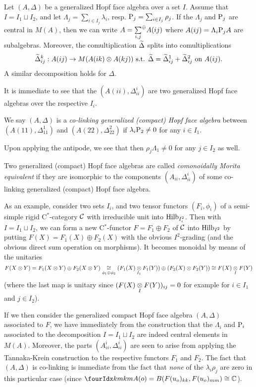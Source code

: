 Let $(A,\Delta)$ be a generalized Hopf face algebra over a set $I$. Assume that $I = I_1\sqcup I_2$, and let $\Lambda_j = \sum_{i\in I_j}\lambda_i$, resp. $\mathrm{P}_j = \sum_{i\in I_j} \rho_j$. If the $\Lambda_j$ and $\mathrm{P}_j$ are central in $M(A)$, then we can write $A = \underset{i,j}{\sum}^{\oplus} A(ij)$ where $A(ij) = \Lambda_i\mathrm{P}_jA$ are subalgebras. Moreover, the comultiplication $\widetilde{\Delta}$ splits into comultiplications \[\widetilde{\Delta}_{ij}^k:A(ij)\rightarrow M(A(ik)\otimes A(kj))\textrm{ s.t. } \widetilde{\Delta} = \widetilde{\Delta}_{ij}^1 +\widetilde{\Delta}_{ij}^2 \textrm{ on }A(ij).\] A similar decomposition holds for $\Delta$.

It is immediate to see that the $(A(ii),\Delta_{ii}^i)$ are two generalized Hopf face algebras over the respective $I_i$.

\begin{Def} We say $(A,\Delta)$ is a \emph{co-linking generalized (compact) Hopf face algebra} between $(A(11),\Delta_{11}^1)$ and $(A(22),\Delta_{22}^2)$ if $\lambda_i\mathrm{P}_2\neq 0$ for any $i\in I_1$.
\end{Def}

Upon applying the antipode, we see that then $\rho_j\Lambda_1\neq 0$ for any $j\in I_2$ as well.

\begin{Def} Two generalized (compact) Hopf face algebras are called \emph{comonoidally Morita equivalent} if they are isomorphic to the components $(A_{ii},\Delta_{ii}^i)$ of some co-linking generalized (compact) Hopf face algebra.\end{Def}

As an example, consider two sets $I_i$, and two tensor functors $(F_i,\phi_i)$ of a semi-simple rigid C$^*$-category $\mathcal{C}$ with irreducible unit into $\mathrm{Hilb}_{I_i^2}$. Then with $I= I_1\sqcup I_2$, we can form a new C$^*$-functor $F=F_1\oplus F_2$ of $\mathcal{C}$ into $\mathrm{Hilb}_{I^2}$ by putting $F(X) = F_1(X)\oplus F_2(X)$ with the obvious $I^2$-grading (and the obvious direct sum operation on morphisms). It becomes monoidal by means of the unitaries \[F(X\otimes Y) = F_1(X\otimes Y)\oplus F_2(X\otimes Y) \underset{\phi_1\oplus \phi_2}{\cong} (F_1(X)\underset{I_1}{\otimes} F_1(Y)) \oplus (F_2(X)\otimes F_2(Y)) \cong F(X)\underset{I}{\otimes} F(Y)\] (where the last map is unitary since $(F(X)\underset{I}{\otimes} F(Y))_{ij}=0$ for example for $i\in I_1$ and $j\in I_2$).

If we then consider the generalized compact Hopf face algebra $(A,\Delta)$ associated to $F$, we have immediately from the construction that the $\Lambda_i$ and $\mathrm{P}_i$ associated to the decomposition $I = I_1\sqcup I_2$ are indeed central elements in $M(A)$. Moreover, the parts $(A_{ii}^i,\Delta_{ii}^i)$ are seen to arise from applying the Tannaka-Krein construction to the respective functors $F_1$ and $F_2$. The fact that $(A,\Delta)$ is co-linking is immediate from the fact that \emph{none} of the $\lambda_i\rho_j$ are zero in this particular case (since $\Gr{A}{k}{k}{m}{m}(o) = B(F(u_o)_{kk},F(u_o)_{mm}) \cong \C$).

